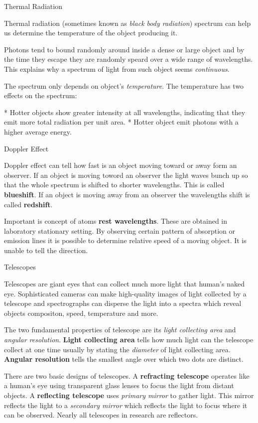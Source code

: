 \sec Thermal Radiation

Thermal radiation (sometimes known as {\em black body radiation}) spectrum can
help us determine the temperature of the object producing it.

Photons tend to bound randomly around inside a dense or large object and by
the time they escape they are randomly speard over a wide range of wavelengths.
This explains why a spectrum of light from such object seems {\em continuous}.

The spectrum only depends on object's {\em temperature}. The temperature has
two effects on the spectrum:

\begitems
* Hotter objects show greater intensity at all wavelengths, indicating that
they emit more total radiation per unit area.
* Hotter object emit photons with a higher average energy.
\enditems

\sec Doppler Effect

Doppler effect can tell how fast is an object moving toward or away form
an observer. If an object is moving toword an observer the light waves bunch
up so that the whole spectrum is shifted to shorter wavelengths. This is called
{\bf blueshift}. If an object is moving away from an observer the wavelengths
shift is called {\bf redshift}.

Important is concept of atoms {\bf rest wavelengths}. These are obtained
in laboratory stationary setting. By observing certain pattern of absorption
or emission lines it is possible to determine relative speed of a moving
object. It is unable to tell the direction.

\sec Telescopes

Telescopes are giant eyes that can collect much more light that human's naked
eye. Sophisticated cameras can make high-quality images of light collected
by a telescope and spectrographs can disperse the light into a spectra which
reveal objects compositon, speed, temperature and more.

The two fundamental properties of telescope are its {\em light collecting area}
and {\em angular resolution}. {\bf Light collecting area} tells how much light
can the telescope collect at one time usually by stating the {\em diameter} of
light collecting area. {\bf Angular resolution} tells the smallest angle over
which two dots are distinct.

There are two basic designs of telescopes. A {\bf refracting telescope}
operates like a human's eye using transparent glass lenses to focus the light
from distant objects. A {\bf reflecting telescope} uses {\em primary mirror} to
gather light. This mirror reflects the light to a {\em secondary mirror} which
reflects the light to focus where it can be observed. Nearly all telescopes
in research are reflectors.
